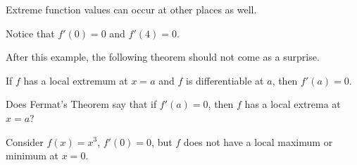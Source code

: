 \documentclass{ximera}
\begin{document}
Extreme function values can occur at other places as well. 

Notice that $f'(0)=0$ and $f'(4)=0$.

After this example, the following theorem should not come as a surprise. 


\begin{theorem}\label{theorem:fermat}
If $f$ has a local extremum at $x=a$ and $f$ is differentiable at $a$, then $f'(a)=0$.
\end{theorem}





\begin{question}

  Does Fermat's Theorem say that if $f'(a) = 0$, then $f$ has a local
  extrema at $x=a$?
  \begin{multipleChoice}
  \end{multipleChoice}
  \begin{feedback}
    Consider $f(x) = x^3$, $f'(0) = 0$, but $f$ does not have a local
    maximum or minimum at $x=0$.
  \end{feedback}
\end{question}
\end{document}
